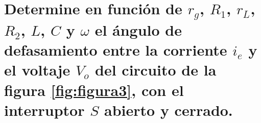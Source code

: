 \documentclass[12pt, letterpaper]{article}
\begin{document}

\section{Determine en función de \(r_g\), \(R_1\), \(r_L\), \(R_2\), \(L\), \(C\) y \(\omega\) el ángulo de defasamiento entre la corriente \(i_e\) y el voltaje \(V_o\) del circuito de la figura \ref{fig:figura3}, con el interruptor \(S\) abierto y cerrado.}






\end{document}
